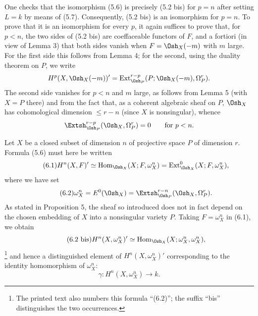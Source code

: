 One checks that the isomorphism (5.6) is precisely (5.2 bis) for $p=n$ after
setting $L=k$ by means of (5.7). Consequently, (5.2 bis) is an isomorphism for
$p=n$. To prove that it is an isomorphism for every $p$, it again suffices to
prove that, for $p<n$, the two sides of (5.2 bis) are coeffaceable functors of
$F$, and a fortiori (in view of Lemma 3) that both sides vanish when
$F=\Osh_X(-m)$ with $m$ large. For the first side this follows from Lemma 4; for
the second, using the duality theorem on $P$, we write
\[
  H^{p}(X,\Osh_X(-m))'
  =\operatorname{Ext}_{\Osh_P}^{r-p}
    (P;\Osh_X(-m),\Omega_P^{r}).
\]
The second side vanishes for $p<n$ and $m$ large, as follows from Lemma 5 (with
$X=P$ there) and from the fact that, as a coherent algebraic sheaf on $P$,
$\Osh_X$ has cohomological dimension $\leq r-n$ (since $X$ is nonsingular),
whence
\[
  \Extsh_{\Osh_P}^{r-p}(\Osh_X,\Omega_P^{r})=0
  \qquad\text{for }p<n.
\]


Let $X$ be a closed subset of dimension $n$ of projective space $P$ of
dimension $r$. Formula (5.6) must here be written
\begin{equation}\tag{6.1}
  H^{n}(X,F)'
  \simeq\operatorname{Hom}_{\Osh_X}(X;F,\omega_X^{n})
  =\operatorname{Ext}_{\Osh_X}^{0}(X;F,\omega_X^{n}),
\end{equation}
where we have set
\begin{equation}\tag{6.2}
  \omega_X^{n}=E^{0}(\Osh_X)
  =\Extsh_{\Osh_P}^{r-n}(\Osh_X,\Omega_P^{r}).
\end{equation}
As stated in Proposition 5, the sheaf so introduced does not in fact depend on
the chosen embedding of $X$ into a nonsingular variety $P$. Taking
$F=\omega_X^{n}$ in (6.1), we obtain
\begin{equation}\tag{6.2 bis}
  H^{n}(X,\omega_X^{n})'
  \simeq\operatorname{Hom}_{\Osh_X}(X;\omega_X^{n},\omega_X^{n}),
\end{equation}
\footnote{The printed text also numbers this formula ``(6.2)''; the suffix
``bis'' distinguishes the two occurrences.} and hence a distinguished element
of $H^{n}(X,\omega_X^{n})'$ corresponding to the identity homomorphism of
$\omega_X^{n}$:
\begin{equation}\tag{6.3}
  \gamma:H^{n}(X,\omega_X^{n})\longrightarrow k.
\end{equation}

